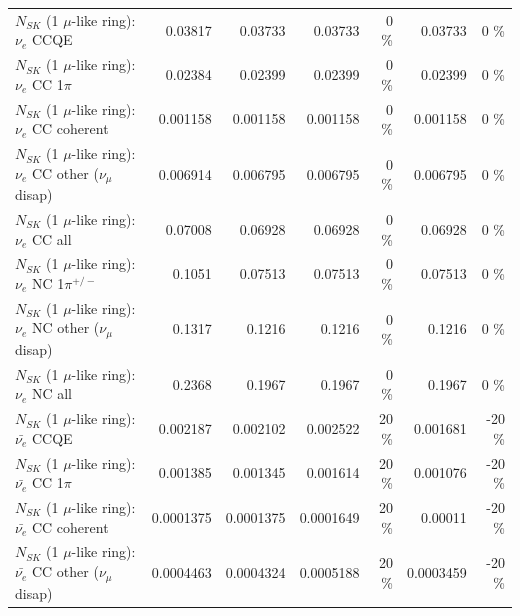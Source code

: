 \begin{table}
\begin{tabular}{| l | r | r | r  r | r  r |}
\hline
\hline
\hline
                                      $N_{SK}$ (1 $\mu$-like ring): $\nu_e$ CCQE &         0.03817 &         0.03733 &         0.03733 &        0 \%  &         0.03733 &        0 \%  \\ 
                                 $N_{SK}$ (1 $\mu$-like ring): $\nu_e$ CC 1$\pi$ &         0.02384 &         0.02399 &         0.02399 &        0 \%  &         0.02399 &        0 \%  \\ 
                               $N_{SK}$ (1 $\mu$-like ring): $\nu_e$ CC coherent &        0.001158 &        0.001158 &        0.001158 &        0 \%  &        0.001158 &        0 \%  \\ 
                $N_{SK}$ (1 $\mu$-like ring): $\nu_e$ CC other ($\nu_\mu$ disap) &        0.006914 &        0.006795 &        0.006795 &        0 \%  &        0.006795 &        0 \%  \\ 
                                  $N_{SK}$ (1 $\mu$-like ring): $\nu_{e}$ CC all &         0.07008 &         0.06928 &         0.06928 &        0 \%  &         0.06928 &        0 \%  \\ 
\hline
                           $N_{SK}$ (1 $\mu$-like ring): $\nu_e$ NC 1$\pi^{+/-}$ &          0.1051 &         0.07513 &         0.07513 &        0 \%  &         0.07513 &        0 \%  \\ 
                $N_{SK}$ (1 $\mu$-like ring): $\nu_e$ NC other ($\nu_\mu$ disap) &          0.1317 &          0.1216 &          0.1216 &        0 \%  &          0.1216 &        0 \%  \\ 
                                  $N_{SK}$ (1 $\mu$-like ring): $\nu_{e}$ NC all &          0.2368 &          0.1967 &          0.1967 &        0 \%  &          0.1967 &        0 \%  \\ 
\hline
\hline
\hline
                                $N_{SK}$ (1 $\mu$-like ring): $\bar{\nu_e}$ CCQE &        0.002187 &        0.002102 &        0.002522 &       20 \%  &        0.001681 &      -20 \%  \\ 
                           $N_{SK}$ (1 $\mu$-like ring): $\bar{\nu_e}$ CC 1$\pi$ &        0.001385 &        0.001345 &        0.001614 &       20 \%  &        0.001076 &      -20 \%  \\ 
                         $N_{SK}$ (1 $\mu$-like ring): $\bar{\nu_e}$ CC coherent &       0.0001375 &       0.0001375 &       0.0001649 &       20 \%  &         0.00011 &      -20 \%  \\ 
          $N_{SK}$ (1 $\mu$-like ring): $\bar{\nu_e}$ CC other ($\nu_\mu$ disap) &       0.0004463 &       0.0004324 &       0.0005188 &       20 \%  &       0.0003459 &      -20 \%  \\ 

\end{tabular}
\end{table}
